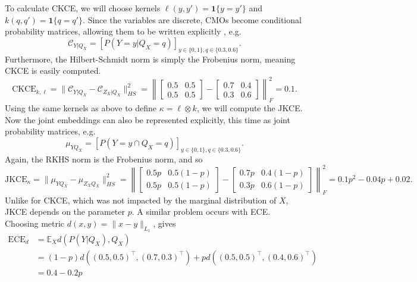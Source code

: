 \documentclass[twocolumn]{article}
\theoremstyle{definition}
\begin{document}
To calculate CKCE, we will choose kernels $\ell(y,y') = \mathbf{1}\{y=y'\}$ and $k(q,q') = \mathbf{1}\{q=q'\}$. Since the variables are discrete, CMOs become conditional probability matrices, allowing them to be written explicitly \cite{Song_2013_kecd}, e.g. 
\begin{equation*}
    \mathcal{C}_{Y|Q_X} = [P(Y=y|Q_X=q)]_{y\in\{0,1\}, q\in\{0.3, 0.6\}}.
\end{equation*}
Furthermore, the Hilbert-Schmidt norm is simply the Frobenius norm, meaning CKCE is easily computed.
\begin{equation*}
    \text{CKCE}_{k, \ell} = \| \mathcal{C}_{Y | Q_X} - \mathcal{C}_{Z_X | Q_X} \|_{HS}^2 = \left\|\begin{bmatrix}
0.5 & 0.5  \\
0.5 & 0.5
\end{bmatrix} - \begin{bmatrix}
0.7 & 0.4  \\
0.3 & 0.6
\end{bmatrix} \right\|_F^2 = 0.1.
\end{equation*}
Using the same kernels as above to define $\kappa = \ell \otimes k$, we will compute the JKCE. Now the joint embeddings can also be represented explicitly, this time as joint probability matrices, e.g. 
\begin{equation*}
    \mu_{Y Q_X} = [P(Y=y \cap Q_X=q)]_{y\in\{0,1\}, q\in\{0.3, 0.6\}}.
\end{equation*}
Again, the RKHS norm is the Frobenius norm, and so
\begin{equation*}
    \text{JKCE}_{\kappa} = \| \mu_{Y Q_X} - \mu_{Z_X Q_X} \|_{HS}^2 = \left\|\begin{bmatrix}
0.5p & 0.5(1-p)  \\
0.5p & 0.5(1-p)
\end{bmatrix} - \begin{bmatrix}
0.7p & 0.4(1-p)  \\
0.3p & 0.6(1-p)
\end{bmatrix} \right\|_F^2 = 0.1p^2 - 0.04p + 0.02.
\end{equation*}
Unlike for CKCE, which was not impacted by the marginal distribution of $X$, JKCE depends on the parameter $p$. A similar problem occurs with ECE. Choosing metric $d(x,y) = \|x-y\|_{L_1}$, gives
\begin{align*}
    \text{ECE}_{d} &= \mathbb{E}_X d(P(Y|Q_X), Q_X) \\
        &= (1-p) d((0.5, 0.5)^\top, (0.7, 0.3)^\top) + p d((0.5, 0.5)^\top, (0.4, 0.6)^\top) \\
        &= 0.4 - 0.2p
\end{align*}
\end{document}
